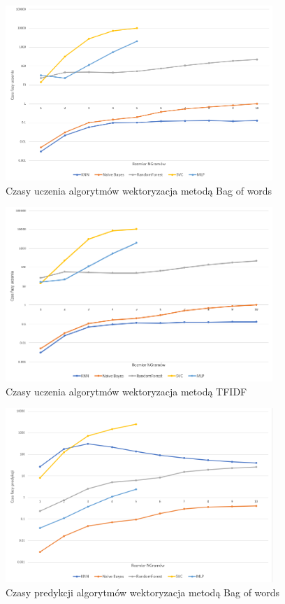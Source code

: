 \begin{figure}[h!]
    \centering
    \includegraphics[width=0.9\textwidth]{./Img/BOWLearn.png}
    \caption{Czasy uczenia algorytmów wektoryzacja metodą Bag of words}
\end{figure}

\begin{figure}[h!]
    \centering
    \includegraphics[width=0.9\textwidth]{./Img/TFIDFLearn.png}
    \caption{Czasy uczenia algorytmów wektoryzacja metodą TFIDF}
\end{figure}

\begin{figure}[h!]
    \centering
    \includegraphics[width=0.9\textwidth]{./Img/BOWPredict.png}
    \caption{Czasy predykcji algorytmów wektoryzacja metodą Bag of words}
\end{figure}


